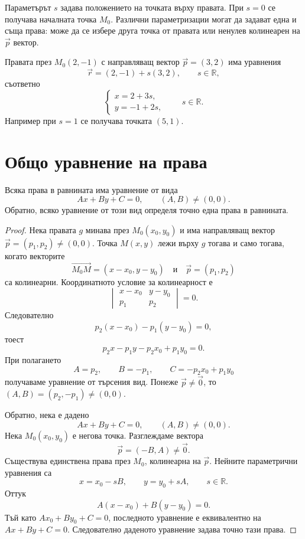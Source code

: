 Параметърът $s$ задава положението на точката върху правата. При $s=0$
се получава началната точка $M_0$. Различни параметризации могат да
задават една и съща права: може да се избере друга точка от правата или
ненулев колинеарен на $\vec p$ вектор.

\begin{example}
Правата през $M_0(2,-1)$ с направляващ вектор
$\vec p=(3,2)$ има уравнения
\[
 \vec r=(2,-1)+s(3,2),\qquad s\in\mathbb R,
\]
съответно
\[
 \begin{cases}
 x=2+3s,\\
 y=-1+2s,
 \end{cases}
 \qquad s\in\mathbb R.
\]
Например при $s=1$ се получава точката $(5,1)$.
\end{example}

\section{Общо уравнение на права}\label{s:28.2}

\begin{keythm}
Всяка права в равнината има уравнение от вида
\[
 Ax+By+C=0,\qquad (A,B)\neq(0,0).
\]
Обратно, всяко уравнение от този вид определя точно една права в
равнината.
\end{keythm}

\begin{proof}
Нека правата $g$ минава през $M_0(x_0,y_0)$ и има направляващ вектор
$\vec p=(p_1,p_2)\neq(0,0)$. Точка $M(x,y)$ лежи върху $g$ тогава и само
тогава, когато векторите
\[
 \overrightarrow{M_0M}=(x-x_0,y-y_0)
 \quad\text{и}\quad
 \vec p=(p_1,p_2)
\]
са колинеарни. Координатното условие за колинеарност е
\[
 \begin{vmatrix}
 x-x_0 & y-y_0\\
 p_1 & p_2
 \end{vmatrix}=0.
\]
Следователно
\[
 p_2(x-x_0)-p_1(y-y_0)=0,
\]
тоест
\[
 p_2x-p_1y-p_2x_0+p_1y_0=0.
\]
При полагането
\[
 A=p_2,\qquad B=-p_1,\qquad C=-p_2x_0+p_1y_0
\]
получаваме уравнение от търсения вид. Понеже $\vec p\neq\vec0$, то
$(A,B)=(p_2,-p_1)\neq(0,0)$.

Обратно, нека е дадено
\[
 Ax+By+C=0,\qquad (A,B)\neq(0,0).
\]
Нека $M_0(x_0,y_0)$ е негова точка. Разглеждаме вектора
\[
 \vec p=(-B,A)\neq\vec0.
\]
Съществува единствена права през $M_0$, колинеарна на $\vec p$. Нейните
параметрични уравнения са
\[
 x=x_0-sB,\qquad y=y_0+sA,\qquad s\in\mathbb R.
\]
Оттук
\[
 A(x-x_0)+B(y-y_0)=0.
\]
Тъй като $Ax_0+By_0+C=0$, последното уравнение е еквивалентно на
$Ax+By+C=0$. Следователно даденото уравнение задава точно тази права.
\end{proof}

